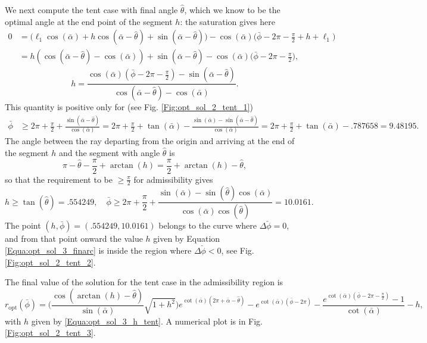 \documentclass[reqno]{amsart}
\theoremstyle{definition} \newtheorem{definition}{Definition}[section]
\theoremstyle{definition} \newtheorem{remark}[definition]{Remark}
\theoremstyle{plain} \newtheorem{lemma}[definition]{Lemma}
\theoremstyle{plain} \newtheorem{proposition}[definition]{Proposition}
\theoremstyle{plain} \newtheorem{theorem}[definition]{Theorem}
\theoremstyle{plain} \newtheorem{corollary}[definition]{Corollary}
\theoremstyle{definition} \newtheorem{example}[definition]{Example}
\theoremstyle{plain} \newtheorem{claim}[clai]{Claim}
\theoremstyle{definition} \newtheorem{assumption}[definition]{Assumption}
\theoremstyle{definition} \newtheorem{observation}[definition]{Observation}
\newcommand{\1}{\mathbbm 1}
\numberwithin{equation}{section} %
\theoremstyle{plain} \newtheorem*{theorem*}{Theorem}
\theoremstyle{plain} \newtheorem{mthm}[maintheorem]{Main Theorem}
\theoremstyle{plain} \newtheorem*{mthm*}{Main Theorem}
\theoremstyle{plain} \newtheorem*{conjecture*}{Conjecture}
\theoremstyle{plain} \newtheorem{conjecture}[definition]{Conjecture}
\theoremstyle{plain} \newtheorem*{problem*}{Problem}
\begin{document}
We next compute the tent case with final angle $\hat \theta$, which we know to be the optimal angle at the end point of the segment $h$: the saturation gives here
\begin{align*}
0 &= \big( \ell_1 \cos(\bar \alpha) + h \cos(\bar \alpha - \hat \theta) + \sin(\bar \alpha - \hat \theta) \big) - \cos(\bar \alpha) \bigg( \bar \phi - 2\pi - \frac{\pi}{2} + h + \ell_1 \bigg) \\
&= h (\cos(\bar\alpha-\hat\theta) - \cos(\bar \alpha)) + \sin(\bar \alpha - \hat \theta) - \cos(\bar \alpha) \bigg( \bar \phi - 2\pi - \frac{\pi}{2} \bigg),
\end{align*}
\begin{equation}
\label{Equa:opt_sol_3_h_tent}
h = \frac{\cos(\bar \alpha) (\bar \phi - 2\pi - \frac{\pi}{2}) - \sin(\bar \alpha - \hat \theta)}{\cos(\bar \alpha - \hat \theta) - \cos(\bar \alpha)}.
\end{equation}
This quantity is positive only for (see Fig. \ref{Fig:opt_sol_2_tent_1})
\begin{align*}
\bar \phi &\geq 2\pi + \frac{\pi}{2} + \frac{\sin(\bar \alpha - \hat \theta)}{\cos(\bar \alpha)} = 2\pi + \frac{\pi}{2} + \tan(\bar \alpha) - \frac{\sin(\bar \alpha) - \sin(\bar \alpha - \hat \theta)}{\cos(\bar \alpha)} = 2\pi + \frac{\pi}{2} + \tan(\bar \alpha) - .787658 = 9.48195.
\end{align*}
The angle between the ray departing from the origin and arriving at the end of the segment $h$ and the segment with angle $\hat \theta$ is
\begin{equation*}
\pi - \hat \theta - \frac{\pi}{2} + \arctan(h) = \frac{\pi}{2} + \arctan(h) - \hat \theta,
\end{equation*}
so that the requirement to be $\geq \frac{\pi}{2}$ for admissibility gives
\begin{equation}
\label{Equa:opt_sol_3_admi_tent}
h \geq \tan(\hat \theta) = .554249, \quad \bar \phi \geq 2\pi + \frac{\pi}{2} + \frac{\sin(\bar \alpha) - \sin(\hat \theta) \cos(\bar\alpha)}{\cos(\bar \alpha) \cos(\hat \theta)} = 10.0161.
\end{equation}
The point $(h,\bar \phi) = (.554249,10.0161)$ belongs to the curve where $\Delta \check \phi = 0$, and from that point onward the value $h$ given by Equation \eqref{Equa:opt_sol_3_finarc} is inside the region where $\Delta \check \phi < 0$, see Fig. \ref{Fig:opt_sol_2_tent_2}.

The final value of the solution for the tent case in the admissibility region is
\begin{equation}
\label{Equa:opt_sol_3_tent_final}
r_\mathrm{opt}(\bar \phi) = \bigg( \frac{\cos(\arctan(h) - \hat \theta)}{\sin(\bar \alpha)} \sqrt{1+h^2} \bigg) e^{\cot(\bar \alpha)(2 \pi + \bar \alpha - \hat \theta)} - e^{\cot(\bar \alpha)(\bar \phi - 2\pi)} - \frac{e^{\cot(\bar \alpha)(\bar \phi - 2\pi - \frac{\pi}{2})} - 1}{\cot(\bar \alpha)} - h,
\end{equation}
with $h$ given by \eqref{Equa:opt_sol_3_h_tent}. A numerical plot is in Fig. \ref{Fig:opt_sol_2_tent_3}.
\end{document}
